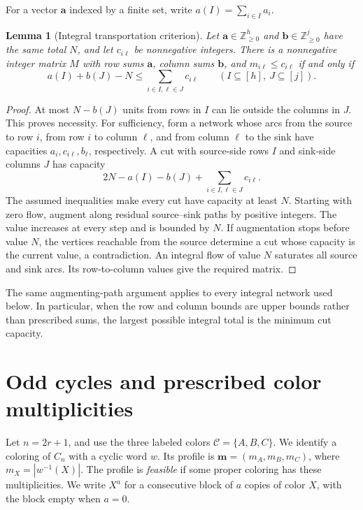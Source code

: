 \documentclass[10pt,a4paper]{amsart}
\numberwithin{equation}{section}
\newtheorem{lemma}[theorem]{Lemma}
\theoremstyle{definition}
\theoremstyle{remark}
\begin{document}
For a vector $\mathbf a$ indexed by a finite set, write
$a(I)=\sum_{i\in I}a_i$.
\begin{lemma}[Integral transportation criterion]\label{lem:transport}
Let $\mathbf a\in\mathbb Z_{\ge0}^{h}$ and
$\mathbf b\in\mathbb Z_{\ge0}^{j}$ have the same total $N$, and let
$c_{i\ell}$ be nonnegative integers. There is a nonnegative integer
matrix $M$ with row sums $\mathbf a$, column sums $\mathbf b$, and
$m_{i\ell}\le c_{i\ell}$ if and only if
\begin{equation}\label{eq:transport-cut}
 a(I)+b(J)-N\le\sum_{i\in I,\ell\in J}c_{i\ell}
 \qquad(I\subseteq[h],\ J\subseteq[j]).
\end{equation}
\end{lemma}
\begin{proof}
At most $N-b(J)$ units from rows in $I$ can lie outside the columns in
$J$. This proves necessity. For sufficiency, form a network whose arcs
from the source to row $i$, from row $i$ to column $\ell$, and from column
$\ell$ to the sink have capacities $a_i,c_{i\ell},b_\ell$, respectively.
A cut with source-side rows $I$ and sink-side columns $J$ has capacity
\[
 2N-a(I)-b(J)+\sum_{i\in I,\ell\in J}c_{i\ell}.
\]
The assumed inequalities make every cut have capacity at least $N$.
Starting with zero flow, augment along residual source--sink paths by
positive integers. The value increases at every step and is bounded by
$N$. If augmentation stops before value $N$, the vertices reachable from
the source determine a cut whose capacity is the current value, a
contradiction. An integral flow of value $N$ saturates all source and sink
arcs. Its row-to-column values give the required matrix.
\end{proof}

The same augmenting-path argument applies to every integral network used
below. In particular, when the row and column bounds are upper bounds
rather than prescribed sums, the largest possible integral total is the
minimum cut capacity.

\section{Odd cycles and prescribed color multiplicities}\label{sec:oddcycles}

Let $n=2r+1$, and use the three labeled colors
$\mathcal C=\{A,B,C\}$. We identify a coloring of $C_n$ with a
cyclic word $w$. Its profile is
$\mathbf m=(m_A,m_B,m_C)$, where
$m_X=|w^{-1}(X)|$. The profile is \emph{feasible} if some proper
coloring has these multiplicities.
We write $X^a$ for a consecutive block of $a$ copies of color $X$,
with the block empty when $a=0$.
\end{document}
